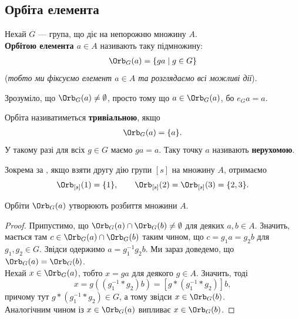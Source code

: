 \documentclass{math_library}
\begin{document}
\subsection{Орбіта елемента}
\begin{definition}
Нехай $G$ --- група, що діє на непорожню множину $A$.\\
\textbf{Орбітою елемента $a \in A$} називають таку підмножину:
\begin{align*}
\Orb_G(a) = \{ga \mid g \in G\}
\end{align*}
(\textit{тобто ми фіксуємо елемент $a \in A$ та розглядаємо всі можливі дії}).
\end{definition}

\begin{remark}
Зрозуміло, що $\Orb_G(a) \neq \emptyset$, просто тому що $a \in \Orb_G(a)$, бо $e_G a = a$.
\end{remark}

\begin{definition}
Орбіта називатиметься \textbf{тривіальною}, якщо
\begin{align*}
\Orb_G(a) = \{a\}.
\end{align*}
У такому разі для всіх $g \in G$ маємо $ga = a$. Таку точку $a$ називають \textbf{нерухомою}. 
\end{definition}

\begin{example}
Зокрема за , якщо взяти другу дію групи $[s]$ на множину $A$, отримаємо
\[
\Orb_{[s]}(1) = \{1\}, \qquad \Orb_{[s]}(2) = \Orb_{[s]}(3) = \{2,3\}.
\]
\end{example}

\begin{proposition}
Орбіти $\Orb_G(a)$ утворюють розбиття множини $A$.
\end{proposition}

\begin{proof}
Припустимо, що $\Orb_G(a) \cap \Orb_G(b) \neq \emptyset$ для деяких $a,b \in A$. Значить, мається там $c \in \Orb_G(a) \cap \Orb_G(b)$ таким чином, що $c = g_1 a = g_2 b$ для $g_1,g_2 \in G$. Звідси одержимо $a = g_1^{-1} g_2 b$. Ми зараз доведемо, що $\Orb_G(a) = \Orb_G(b)$.\\
Нехай $x \in \Orb_G(a)$, тобто $x = ga$ для деякого $g \in A$. Значить, тоді 
\[
x = g((g_1^{-1}*g_2) b) = [g*(g_1^{-1}*g_2)] b,
\]
причому тут $g*(g_1^{-1}*g_2) \in G$, а тому звідси $x \in \Orb_G(b)$.\\
Аналогічним чином із $x \in \Orb_G(a)$ випливає $x \in \Orb_G(b)$.
\end{proof}
\end{document}
